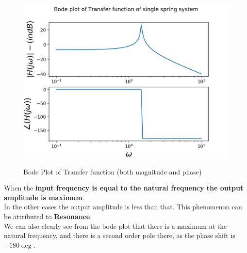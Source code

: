 \documentclass[11pt, a4paper]{article}
\begin{document}
\begin{figure}[H]
   	\centering
   	\includegraphics[scale=0.8]{bode_ss.png}
   	\label{fig:bode_ss}
   	\caption{Bode Plot of Transfer function (both magnitude and phase)}
\end{figure}
{
When the \textbf{input frequency is equal to the natural frequency the output amplitude is maximum}.
\\In the other cases the output amplitude is less than that.
This phenomenon can be attributed to \textbf{Resonance}.
\\
We can also clearly see from the bode plot that there is a maximum at the natural frequency, and there is a second order pole there, as the phase shift is $-180\deg$.
}
\end{document}
